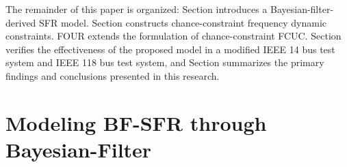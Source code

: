 \documentclass[lettersize,journal]{IEEEtran}
\newcommand{\Rmnum}[1]{\uppercase\expandafter{\romannumeral #1}}
\newcommand{\slfrac}[2]{\left.#1\middle/#2\right.}
\begin{document}
The remainder of this paper is organized: Section \Rmnum{2} introduces a Bayesian-filter-derived SFR model. Section \Rmnum{3} constructs chance-constraint frequency dynamic constraints. \Rmnum{Four} extends the formulation of chance-constraint FCUC. Section \Rmnum{5} verifies the effectiveness of the proposed model in a modified IEEE 14 bus test system and IEEE 118 bus test system, and Section \Rmnum{6} summarizes the primary findings and conclusions presented in this research.

\vspace{-0.125in}
\section{Modeling BF-SFR through Bayesian-Filter}


\end{document}
